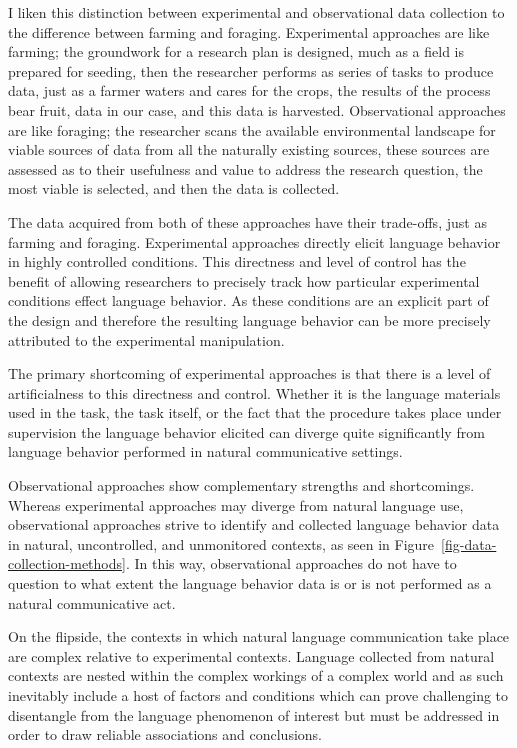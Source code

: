 \documentclass[
  letterpaper,
]{latex/krantz}
\theoremstyle{definition}
\theoremstyle{remark}
\begin{document}
I liken this distinction between experimental and observational data
collection to the difference between farming and foraging. Experimental
approaches are like farming; the groundwork for a research plan is
designed, much as a field is prepared for seeding, then the researcher
performs as series of tasks to produce data, just as a farmer waters and
cares for the crops, the results of the process bear fruit, data in our
case, and this data is harvested. Observational approaches are like
foraging; the researcher scans the available environmental landscape for
viable sources of data from all the naturally existing sources, these
sources are assessed as to their usefulness and value to address the
research question, the most viable is selected, and then the data is
collected.

The data acquired from both of these approaches have their trade-offs,
just as farming and foraging. Experimental approaches directly elicit
language behavior in highly controlled conditions. This directness and
level of control has the benefit of allowing researchers to precisely
track how particular experimental conditions effect language behavior.
As these conditions are an explicit part of the design and therefore the
resulting language behavior can be more precisely attributed to the
experimental manipulation.

The primary shortcoming of experimental approaches is that there is a
level of artificialness to this directness and control. Whether it is
the language materials used in the task, the task itself, or the fact
that the procedure takes place under supervision the language behavior
elicited can diverge quite significantly from language behavior
performed in natural communicative settings.

Observational approaches show complementary strengths and shortcomings.
Whereas experimental approaches may diverge from natural language use,
observational approaches strive to identify and collected language
behavior data in natural, uncontrolled, and unmonitored contexts, as
seen in Figure~\ref{fig-data-collection-methods}. In this way,
observational approaches do not have to question to what extent the
language behavior data is or is not performed as a natural communicative
act.

On the flipside, the contexts in which natural language communication
take place are complex relative to experimental contexts. Language
collected from natural contexts are nested within the complex workings
of a complex world and as such inevitably include a host of factors and
conditions which can prove challenging to disentangle from the language
phenomenon of interest but must be addressed in order to draw reliable
associations and conclusions.
\end{document}
